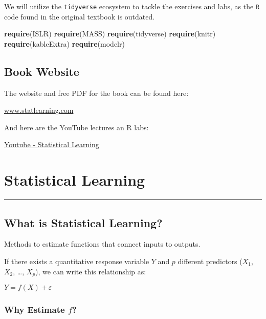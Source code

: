 \documentclass[]{book}
\newenvironment{Shaded}{\begin{snugshade}}{\end{snugshade}}
\newcommand{\KeywordTok}[1]{\textcolor[rgb]{0.13,0.29,0.53}{\textbf{#1}}}
\newcommand{\NormalTok}[1]{#1}
\theoremstyle{definition}
\theoremstyle{definition}
\theoremstyle{definition}
\theoremstyle{remark}
\begin{document}
We will utilize the \texttt{tidyverse} ecosystem to tackle the exercises
and labs, as the \texttt{R} code found in the original textbook is
outdated.

\begin{Shaded}
\begin{Highlighting}[]
\KeywordTok{require}\NormalTok{(ISLR)}
\KeywordTok{require}\NormalTok{(MASS)}
\KeywordTok{require}\NormalTok{(tidyverse)}
\KeywordTok{require}\NormalTok{(knitr)}
\KeywordTok{require}\NormalTok{(kableExtra)}
\KeywordTok{require}\NormalTok{(modelr)}
\end{Highlighting}
\end{Shaded}

\section{Book Website}\label{book-website}

The website and free PDF for the book can be found here:

\href{http://www-bcf.usc.edu/~gareth/ISL/}{www.statlearning.com}

And here are the YouTube lectures an R labs:

\href{https://www.youtube.com/channel/UC4OWDcPB1peiBXDfCSZ3h-w}{Youtube
- Statistical Learning}

\chapter{Statistical Learning}\label{statistical-learning}

\begin{center}\rule{0.5\linewidth}{\linethickness}\end{center}

\section{What is Statistical
Learning?}\label{what-is-statistical-learning}

Methods to estimate functions that connect inputs to outputs.

If there exists a quantitative response variable \(Y\) and \(p\)
different predictors (\(X_1\), \(X_2\), \ldots{}, \(X_p\)), we can write
this relationship as:

\(Y = f(X) + ε\)

\subsection{\texorpdfstring{Why Estimate
\emph{\(f\)}?}{Why Estimate f?}}\label{why-estimate-f}
\end{document}
